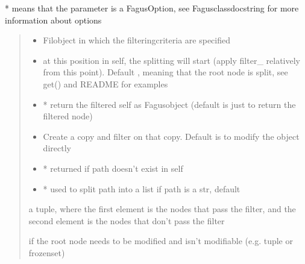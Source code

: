 \documentclass[a4paper,10pt,english]{sphinxmanual}
\begin{document}
\begin{fulllineitems}
\begin{fulllineitems}
\sphinxAtStartPar
* means that the parameter is a FagusOption, see Fagus\sphinxhyphen{}class\sphinxhyphen{}docstring for more information about options
\begin{quote}\begin{description}
\begin{itemize}
\item {}
\sphinxAtStartPar
{} \textendash{} Fil\sphinxhyphen{}object in which the filtering\sphinxhyphen{}criteria are specified

\item {}
\sphinxAtStartPar
{} \textendash{} at this position in self, the splitting will start (apply filter\_ relatively from this point).
Default , meaning that the root node is split, see get() and README for examples

\item {}
\sphinxAtStartPar
{} \textendash{} * return the filtered self as Fagus\sphinxhyphen{}object (default is just to return the filtered node)

\item {}
\sphinxAtStartPar
{} \textendash{} Create a copy and filter on that copy. Default is to modify the object directly

\item {}
\sphinxAtStartPar
{} \textendash{} * returned if path doesn’t exist in self

\item {}
\sphinxAtStartPar
{} \textendash{} * used to split path into a list if path is a str, default 

\end{itemize}

\sphinxAtStartPar
a tuple, where the first element is the nodes that pass the filter, and the second element is the nodes that
don’t pass the filter

\sphinxAtStartPar
{} \textendash{} if the root node needs to be modified and isn’t modifiable (e.g. tuple or frozenset)

\end{description}\end{quote}


\end{fulllineitems}
\end{fulllineitems}
\end{document}
